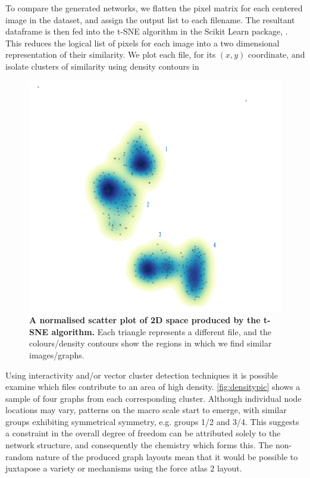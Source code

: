 To compare the generated networks, we flatten the pixel matrix for each centered image in the dataset, and assign the output list to each filename. The resultant dataframe is then fed into the t-SNE algorithm in the Scikit Learn package, \cite{scikit-learn}. This reduces the logical list of pixels for each image into a two dimensional representation of their similarity. We plot each file, for its $(x,y)$ coordinate, and isolate clusters of similarity using density contours in 

    \begin{figure}[H]
         \centering
    \includegraphics[width=.6\textwidth]{figures_c1/beijingtest/density.png}
     \caption{\textbf{A normalised scatter plot of 2D space produced by the t-SNE algorithm.} Each triangle represents a different file, and the colours/density contours show the regions in which we find similar images/graphs. }
     \label{fig:densty}
     \end{figure}

Using interactivity and/or vector cluster detection techniques it is possible examine which files contribute to an area of high density. \autoref{fig:densitypic} shows a sample of four graphs from each corresponding cluster. Although individual node locations may vary, patterns on the macro scale start to emerge, with similar groups exhibiting symmetrical symmetry, e.g. groups 1/2 and 3/4. This suggests a constraint in the overall degree of freedom can be attributed solely to the network structure, and consequently the chemistry which forms this. The non-random nature of the produced graph layouts mean that it would be possible to juxtapose a variety or mechanisms using the force atlas 2 layout.

